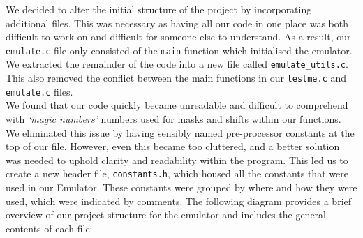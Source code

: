 \documentclass[10pt]{article}
\begin{document}
We decided to alter the initial structure of the project by incorporating additional files. This was necessary as having all our code in one place was both difficult to work on and difficult for someone else to understand. As a result, our {\tt emulate.c} file only consisted of the {\tt main} function which initialised the emulator. We extracted the remainder of the code into a new file called {\tt emulate\_utils.c}. This also removed the conflict between the main functions in our {\tt testme.c} and {\tt emulate.c} files.
 \\

We found that our code quickly became unreadable and difficult to comprehend with \textsl{‘magic numbers’} numbers used for masks and shifts within our functions. We eliminated this issue by having sensibly named pre-processor constants at the top of our file. However, even this became too cluttered, and a better solution was needed to uphold clarity and readability within the program. This led us to create a new header file, {\tt constants.h}, which housed all the constants that were used in our Emulator. These constants were grouped by where and how they were used, which were indicated by comments. The following diagram provides a brief overview of our project structure for the emulator and includes the
general contents of each file:

\vspace{0.3cm}

\end{document}
